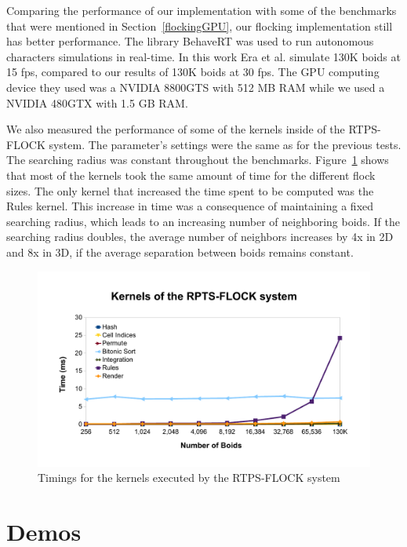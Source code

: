 Comparing the performance of our implementation with some of the benchmarks that were mentioned in Section~\ref{flockingGPU}, our flocking implementation still has better performance. The library BehaveRT was used to run autonomous characters simulations in real-time. 
In this work Era et al. simulate 130K boids at 15 fps, compared to our results of 130K boids at 30 fps. The GPU computing device they used was a NVIDIA 8800GTS with 512 MB RAM while we used a NVIDIA 480GTX with 1.5 GB RAM. 

We also measured the performance of some of the kernels inside of the RTPS-FLOCK system. The parameter's settings were the same as for the previous tests. The searching radius was constant throughout the benchmarks. Figure~\ref{kernelBench} shows that most of the kernels took the same amount of time for the different flock sizes. The only kernel that increased the time spent to be computed was the Rules kernel. This increase in time was a consequence of maintaining a fixed searching radius, which leads to an increasing number of neighboring boids. If the searching radius doubles, the average number of neighbors increases by 4x in 2D and 8x in 3D, if the average separation between boids 
remains constant. 

\begin{figure}[htbp]
\begin{center}
\includegraphics[scale=0.7]{figures/kernelsPlot.pdf}
\caption{Timings for the kernels executed by the RTPS-FLOCK system}
\label{kernelBench}
\end{center}
\end{figure}


\section{Demos}

